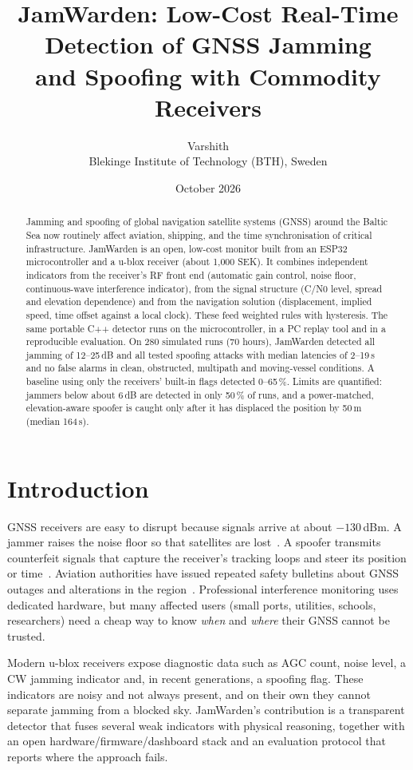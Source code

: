 \documentclass[11pt,a4paper]{article}
\title{\textbf{JamWarden}: Low-Cost Real-Time Detection of GNSS Jamming\\ and Spoofing with Commodity Receivers}
\author{Varshith\\ \small Blekinge Institute of Technology (BTH), Sweden}
\date{October 2026}
\begin{document}
\maketitle

\begin{abstract}
Jamming and spoofing of global navigation satellite systems (GNSS) around the Baltic Sea now routinely
affect aviation, shipping, and the time synchronisation of critical infrastructure. JamWarden is an open,
low-cost monitor built from an ESP32 microcontroller and a u-blox receiver (about 1{,}000 SEK). It combines
independent indicators from the receiver's RF front end (automatic gain control, noise floor, continuous-wave
interference indicator), from the signal structure (C/N0 level, spread and elevation dependence) and from the
navigation solution (displacement, implied speed, time offset against a local clock). These feed weighted
rules with hysteresis. The same portable C++ detector runs on the microcontroller, in a PC replay tool and
in a reproducible evaluation. On 280 simulated runs (70 hours), JamWarden detected all jamming of 12--25\,dB
and all tested spoofing attacks with median latencies of 2--19\,s and no false alarms in clean, obstructed,
multipath and moving-vessel conditions. A baseline using only the receivers' built-in flags detected
0--65\,\%. Limits are quantified: jammers below about 6\,dB are detected in only 50\,\% of runs, and a
power-matched, elevation-aware spoofer is caught only after it has displaced the position by 50\,m (median
164\,s).
\end{abstract}

\section{Introduction}
GNSS receivers are easy to disrupt because signals arrive at about $-130$\,dBm. A jammer raises the noise
floor so that satellites are lost~\cite{borio}. A spoofer transmits counterfeit signals that capture the
receiver's tracking loops and steer its position or time~\cite{humphreys08,psiaki}. Aviation authorities have
issued repeated safety bulletins about GNSS outages and alterations in the region~\cite{easa}. Professional
interference monitoring uses dedicated hardware, but many affected users (small ports, utilities, schools,
researchers) need a cheap way to know \emph{when} and \emph{where} their GNSS cannot be trusted.

Modern u-blox receivers expose diagnostic data such as AGC count, noise level, a CW jamming indicator and, in
recent generations, a spoofing flag. These indicators are noisy and not always present, and on their own
they cannot separate jamming from a blocked sky. JamWarden's contribution is a transparent detector that
fuses several weak indicators with physical reasoning, together with an open hardware/firmware/dashboard
stack and an evaluation protocol that reports where the approach fails.
\end{document}
